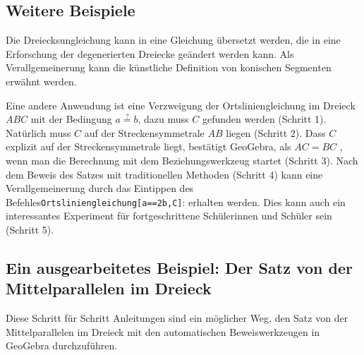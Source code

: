 \documentclass{article}
\begin{document}
\subsection{Weitere Beispiele}

Die Dreiecksungleichung kann in eine Gleichung übersetzt werden, die in eine Erforschung der degenerierten Dreiecke geändert werden kann. Als Verallgemeinerung kann die künstliche Definition von konischen Segmenten erwähnt werden.

Eine andere Anwendung ist eine Verzweigung der Ortsliniengleichung im Dreieck $ABC$ mit der Bedingung $a\stackrel{?}{=}b$, dazu muss $C$ gefunden werden (Schritt 1). Natürlich muss $C$ auf der Streckensymmetrale  $AB$ liegen (Schritt 2). Dass  $C$ explizit auf der Streckensymmetrale liegt, bestätigt GeoGebra, als $AC=BC$ , wenn man die Berechnung mit dem Beziehungswerkzeug startet (Schritt 3). Nach dem Beweis des Satzes mit traditionellen Methoden (Schritt 4) kann eine Verallgemeinerung durch das Eintippen des Befehles\texttt{Ortsliniengleichung[a==2b,C]}: erhalten werden. Dies kann auch ein interessantes Experiment für fortgeschrittene Schülerinnen und Schüler sein (Schritt 5).

\subsection{Ein ausgearbeitetes Beispiel: Der Satz von der Mittelparallelen im Dreieck}

Diese Schritt für Schritt Anleitungen sind ein möglicher Weg, den Satz von der Mittelparallelen im Dreieck mit den automatischen Beweiswerkzeugen in GeoGebra durchzuführen.
\end{document}
